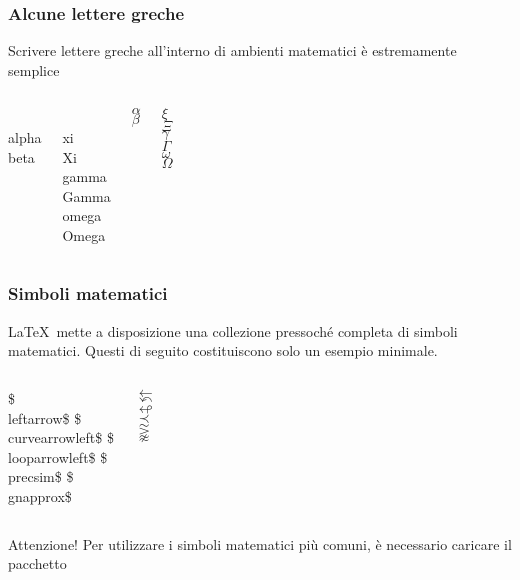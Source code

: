 \documentclass[svgnames,%
	ucs,%
	pdftex]{guitbeamer}
\begin{document}
\begin{frame}
  \frametitle{Alcune lettere greche}
	Scrivere lettere greche all'interno di ambienti matematici \`e estremamente semplice
	\begin{columns}
		\begin{LaTeXcode}
			\\alpha\n
			\\beta
		\end{LaTeXcode}
		\begin{LaTeXcode}
			\\xi\n
			\\Xi\n
			\\gamma\n
			\\Gamma\n
			\\omega\n
			\\Omega
		\end{LaTeXcode}
	  \column[t]{.3\textwidth}
		\begin{LaTeXoutput}
			$\alpha$\\
			$\beta$
		\end{LaTeXoutput}
		\begin{LaTeXoutput}
			$\xi$\\
			$\Xi$\\
			$\gamma$\\
			$\Gamma$\\
			$\omega$\\
			$\Omega$
		\end{LaTeXoutput}
	\end{columns}
\end{frame}
\begin{frame}
  \frametitle{Simboli matematici}
	\LaTeX\ mette a disposizione una collezione pressoch\'e completa di simboli matematici. Questi di seguito costituiscono solo un esempio minimale.
  \begin{columns}
	\begin{LaTeXcode}
		\$\\leftarrow\$\n
		\$\\curvearrowleft\$\n
		\$\\looparrowleft\$\n
		\$\\precsim\$\n
		\$\\gnapprox\$
	\end{LaTeXcode}
	\begin{LaTeXoutput}
		$\leftarrow$\\[.1ex]
		$\curvearrowleft$\\[.1ex]
		$\looparrowleft$\\[.1ex]
		$\precsim$\\[.1ex]
		$\gnapprox$
	\end{LaTeXoutput}
  \end{columns}
	\begin{block}{Attenzione!}
	Per utilizzare i simboli matematici pi\`u comuni, \`e necessario caricare il pacchetto 
	\end{block}
\end{frame}
\end{document}
